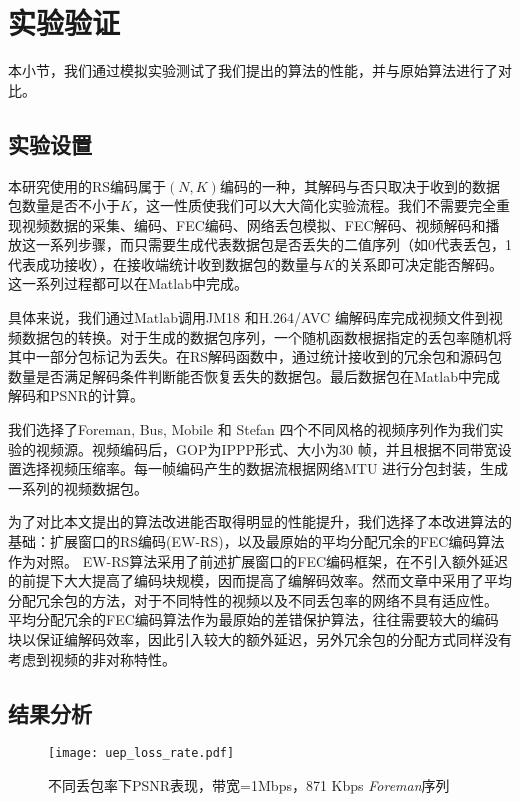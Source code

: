 \section{实验验证}
本小节，我们通过模拟实验测试了我们提出的算法的性能，并与原始算法进行了对比。

    \subsection{实验设置}
    本研究使用的RS编码属于$(N,K)$编码的一种，其解码与否只取决于收到的数据包数量是否不小于$K$，这一性质使我们可以大大简化实验流程。我们不需要完全重现视频数据的采集、编码、FEC编码、网络丢包模拟、FEC解码、视频解码和播放这一系列步骤，而只需要生成代表数据包是否丢失的二值序列（如0代表丢包，1代表成功接收），在接收端统计收到数据包的数量与$K$的关系即可决定能否解码。这一系列过程都可以在Matlab中完成。
    
    具体来说，我们通过Matlab调用JM18 \cite{website:jm18}和H.264/AVC \cite{zhang2000video} 编解码库完成视频文件到视频数据包的转换。对于生成的数据包序列，一个随机函数根据指定的丢包率随机将其中一部分包标记为丢失。在RS解码函数中，通过统计接收到的冗余包和源码包数量是否满足解码条件判断能否恢复丢失的数据包。最后数据包在Matlab中完成解码和PSNR的计算。

    我们选择了Foreman, Bus, Mobile 和 Stefan 四个不同风格的视频序列作为我们实验的视频源。视频编码后，GOP为IPPP形式、大小为30 帧，并且根据不同带宽设置选择视频压缩率。每一帧编码产生的数据流根据网络MTU 进行分包封装，生成一系列的视频数据包。
    
    为了对比本文提出的算法改进能否取得明显的性能提升，我们选择了本改进算法的基础：扩展窗口的RS编码(EW-RS)\cite{xiao2013real}，以及最原始的平均分配冗余的FEC编码算法作为对照。
    EW-RS算法采用了前述扩展窗口的FEC编码框架，在不引入额外延迟的前提下大大提高了编码块规模，因而提高了编解码效率。然而文章中采用了平均分配冗余包的方法，对于不同特性的视频以及不同丢包率的网络不具有适应性。
    平均分配冗余的FEC编码算法作为最原始的差错保护算法，往往需要较大的编码块以保证编解码效率，因此引入较大的额外延迟，另外冗余包的分配方式同样没有考虑到视频的非对称特性。

    \subsection{结果分析}

\begin{figure}[htbp]
  \centering
  \texttt{[image: uep\_loss\_rate.pdf]}\\
  \caption{不同丢包率下PSNR表现，带宽=1Mbps，871 Kbps \emph{Foreman}序列}\label{fig:lossrate}
\end{figure}

